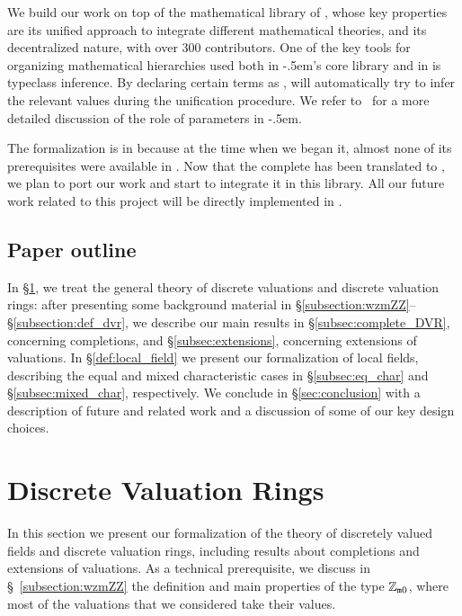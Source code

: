 \documentclass[sigplan,screen]{acmart}
\begin{document}
We build our work on top of the mathematical library \mathlib of \lean{\empty}, whose key properties are its unified approach to integrate different mathematical theories, and its decentralized nature, with over 300 contributors. One of the key tools for organizing mathematical hierarchies used both in \lean[\empty]\kern-.5em's core library and in \mathlib is typeclass inference. By declaring certain terms as , \lean[\empty] will automatically try to infer the relevant values during the unification procedure. We refer to~\cite{Baa22} for a more detailed discussion of the role of  parameters in \lean[\empty]\kern-.5em.

The formalization is in \lean because at the time when we began it, almost none of its prerequisites were available in \lean[4]. Now that the complete \mathlib has been translated to \lean[4], we plan to port our work and start to integrate it in this library. All our future work related to this project will be directly implemented in \lean[4].

\subsection{Paper outline}
In \S\ref{section:dvr}, we treat the general theory of discrete valuations and discrete valuation rings: after presenting some background material in \S\ref{subsection:wzmZZ}--\S\ref{subsection:def_dvr}, we describe our main results in \S\ref{subsec:complete_DVR}, concerning completions, and \S\ref{subsec:extensions}, concerning extensions of valuations. In \S\ref{def:local_field} we present our formalization of local fields, describing the equal and mixed characteristic cases in \S\ref{subsec:eq_char} and \S\ref{subsec:mixed_char}, respectively. We conclude in \S\ref{sec:conclusion} with a description of future and related work and a discussion of some of our key design choices.

\section {Discrete Valuation Rings}\label{section:dvr}

In this section we present our formalization of the theory of discretely valued fields and discrete valuation rings, including results about completions and extensions of valuations. As a technical prerequisite, we discuss in \S~\ref{subsection:wzmZZ} the definition and main properties of the \mathlib type $\mathbb{Z}_{\mathtt{m}0}$, where most of the valuations that we considered take their values.
\end{document}
